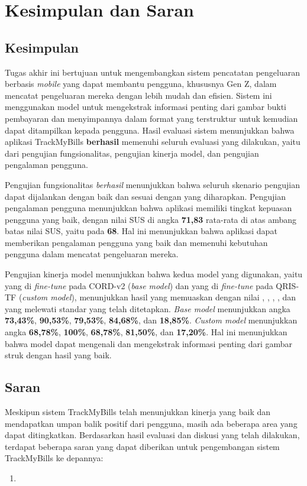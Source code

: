 \chapter{Kesimpulan dan Saran}

\section{Kesimpulan}
\label{sec:kesimpulan}
Tugas akhir ini bertujuan untuk mengembangkan sistem pencatatan pengeluaran berbasis \emph{mobile} yang dapat membantu pengguna, khususnya Gen Z, dalam mencatat pengeluaran mereka dengan lebih mudah dan efisien. Sistem ini menggunakan model \donut{} untuk mengekstrak informasi penting dari gambar bukti pembayaran dan menyimpannya dalam format yang terstruktur untuk kemudian dapat ditampilkan kepada pengguna. Hasil evaluasi sistem menunjukkan bahwa aplikasi TrackMyBills \textbf{berhasil} memenuhi seluruh evaluasi yang dilakukan, yaitu dari pengujian fungsionalitas, pengujian kinerja model, dan pengujian pengalaman pengguna. 

Pengujian fungsionalitas \emph{berhasil} menunjukkan bahwa seluruh skenario pengujian dapat dijalankan dengan baik dan sesuai dengan yang diharapkan. Pengujian pengalaman pengguna menunjukkan bahwa aplikasi memiliki tingkat kepuasan pengguna yang baik, dengan nilai SUS di angka \textbf{71,83} rata-rata di atas ambang batas nilai SUS, yaitu pada \textbf{68}. Hal ini menunjukkan bahwa aplikasi dapat memberikan pengalaman pengguna yang baik dan memenuhi kebutuhan pengguna dalam mencatat pengeluaran mereka.

Pengujian kinerja model menunjukkan bahwa kedua model yang digunakan, yaitu \donut{} yang di \emph{fine-tune} pada \dataset{} CORD-v2 (\emph{base model}) dan \donut{} yang di \emph{fine-tune} pada \dataset{} QRIS-TF (\emph{custom model}), menunjukkan hasil yang memuaskan dengan nilai \accuracy, \precision, \recall, \fscore, dan \mcer{} yang melewati standar yang telah ditetapkan. \emph{Base model} menunjukkan angka \accuracy{} \textbf{73,43\%}, \precision{} \textbf{90,53\%}, \recall{} \textbf{79,53\%}, \fscore{} \textbf{84,68\%}, dan \mcer{} \textbf{18,85\%}. \emph{Custom model} menunjukkan angka \accuracy{} \textbf{68,78\%}, \precision{} \textbf{100\%}, \recall{} \textbf{68,78\%}, \fscore{} \textbf{81,50\%}, dan \mcer{} \textbf{17,20\%}. Hal ini menunjukkan bahwa model dapat mengenali dan mengekstrak informasi penting dari gambar struk dengan hasil yang baik. 

\section{Saran}
\label{sec:saran}
Meskipun sistem TrackMyBills telah menunjukkan kinerja yang baik dan mendapatkan umpan balik positif dari pengguna, masih ada beberapa area yang dapat ditingkatkan. Berdasarkan hasil evaluasi dan diskusi yang telah dilakukan, terdapat beberapa saran yang dapat diberikan untuk pengembangan sistem TrackMyBills ke depannya:
\begin{enumerate}
    \item 
\end{enumerate}